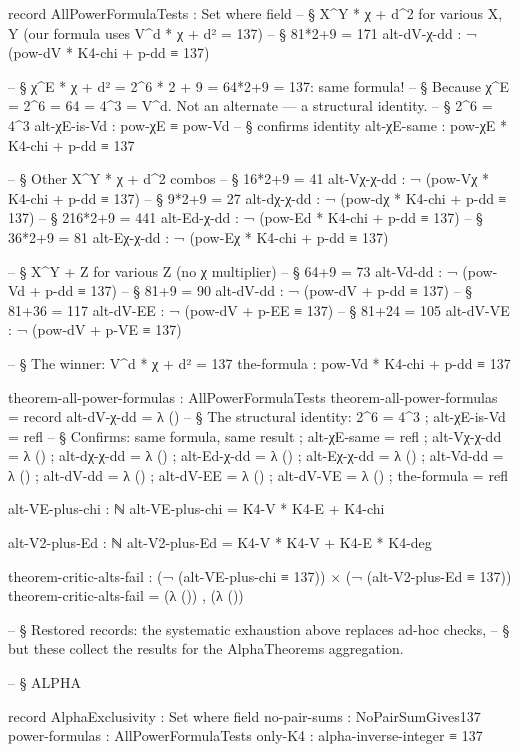 \documentclass[11pt,a4paper]{book}
\begin{document}
\begin{code}
record AllPowerFormulaTests : Set where
  field
    -- § X^Y * χ + d^2 for various X, Y (our formula uses V^d * χ + d² = 137)
    -- § 81*2+9 = 171
    alt-dV-χ-dd  : ¬ (pow-dV * K4-chi + p-dd ≡ 137)

    -- § χ^E * χ + d² = 2^6 * 2 + 9 = 64*2+9 = 137: same formula!
    -- § Because χ^E = 2^6 = 64 = 4^3 = V^d. Not an alternate — a structural identity.
    -- § 2^6 = 4^3
    alt-χE-is-Vd     : pow-χE ≡ pow-Vd
    -- § confirms identity
    alt-χE-same       : pow-χE * K4-chi + p-dd ≡ 137

    -- § Other X^Y * χ + d^2 combos
    -- § 16*2+9 = 41
    alt-Vχ-χ-dd  : ¬ (pow-Vχ * K4-chi + p-dd ≡ 137)
    -- § 9*2+9 = 27
    alt-dχ-χ-dd  : ¬ (pow-dχ * K4-chi + p-dd ≡ 137)
    -- § 216*2+9 = 441
    alt-Ed-χ-dd  : ¬ (pow-Ed * K4-chi + p-dd ≡ 137)
    -- § 36*2+9 = 81
    alt-Eχ-χ-dd  : ¬ (pow-Eχ * K4-chi + p-dd ≡ 137)

    -- § X^Y + Z for various Z (no χ multiplier)
    -- § 64+9 = 73
    alt-Vd-dd    : ¬ (pow-Vd + p-dd ≡ 137)
    -- § 81+9 = 90
    alt-dV-dd    : ¬ (pow-dV + p-dd ≡ 137)
    -- § 81+36 = 117
    alt-dV-EE    : ¬ (pow-dV + p-EE ≡ 137)
    -- § 81+24 = 105
    alt-dV-VE    : ¬ (pow-dV + p-VE ≡ 137)

    -- § The winner: V^d * χ + d² = 137
    the-formula  : pow-Vd * K4-chi + p-dd ≡ 137

theorem-all-power-formulas : AllPowerFormulaTests
theorem-all-power-formulas = record
  { alt-dV-χ-dd  = λ ()
  -- § The structural identity: 2^6 = 4^3
  ; alt-χE-is-Vd = refl
  -- § Confirms: same formula, same result
  ; alt-χE-same  = refl
  ; alt-Vχ-χ-dd  = λ ()
  ; alt-dχ-χ-dd  = λ ()
  ; alt-Ed-χ-dd  = λ ()
  ; alt-Eχ-χ-dd  = λ ()
  ; alt-Vd-dd    = λ ()
  ; alt-dV-dd    = λ ()
  ; alt-dV-EE    = λ ()
  ; alt-dV-VE    = λ ()
  ; the-formula  = refl
  }

alt-VE-plus-chi : ℕ
alt-VE-plus-chi = K4-V * K4-E + K4-chi

alt-V2-plus-Ed : ℕ
alt-V2-plus-Ed = K4-V * K4-V + K4-E * K4-deg

theorem-critic-alts-fail : (¬ (alt-VE-plus-chi ≡ 137)) × (¬ (alt-V2-plus-Ed ≡ 137))
theorem-critic-alts-fail = (λ ()) , (λ ())

-- § Restored records: the systematic exhaustion above replaces ad-hoc checks,
-- § but these collect the results for the AlphaTheorems aggregation.


-- § ALPHA

record AlphaExclusivity : Set where
  field
    no-pair-sums   : NoPairSumGives137
    power-formulas : AllPowerFormulaTests
    only-K4        : alpha-inverse-integer ≡ 137


\end{code}
\end{document}
